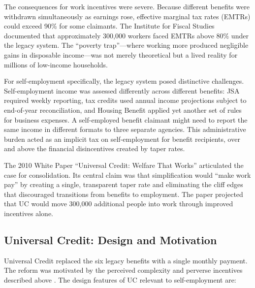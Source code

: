 \documentclass[12pt]{article}
\begin{document}
The consequences for work incentives were severe. Because different benefits were withdrawn simultaneously as earnings rose, effective marginal tax rates (EMTRs) could exceed 90\% for some claimants. The Institute for Fiscal Studies documented that approximately 300,000 workers faced EMTRs above 80\% under the legacy system. The ``poverty trap''---where working more produced negligible gains in disposable income---was not merely theoretical but a lived reality for millions of low-income households.

For self-employment specifically, the legacy system posed distinctive challenges. Self-employment income was assessed differently across different benefits: JSA required weekly reporting, tax credits used annual income projections subject to end-of-year reconciliation, and Housing Benefit applied yet another set of rules for business expenses. A self-employed benefit claimant might need to report the same income in different formats to three separate agencies. This administrative burden acted as an implicit tax on self-employment for benefit recipients, over and above the financial disincentives created by taper rates.

The 2010 White Paper ``Universal Credit: Welfare That Works'' \citep{DWP2010} articulated the case for consolidation. Its central claim was that simplification would ``make work pay'' by creating a single, transparent taper rate and eliminating the cliff edges that discouraged transitions from benefits to employment. The paper projected that UC would move 300,000 additional people into work through improved incentives alone.

\subsection{Universal Credit: Design and Motivation}

Universal Credit replaced the six legacy benefits with a single monthly payment. The reform was motivated by the perceived complexity and perverse incentives described above \citep{DWP2010}. The design features of UC relevant to self-employment are:
\end{document}
